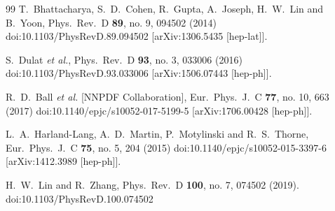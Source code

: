 \begin{thebibliography}{99}
  T.~Bhattacharya, S.~D.~Cohen, R.~Gupta, A.~Joseph, H.~W.~Lin and B.~Yoon,
  Phys.\ Rev.\ D {\bf 89}, no. 9, 094502 (2014)
  doi:10.1103/PhysRevD.89.094502
  [arXiv:1306.5435 [hep-lat]].


  S.~Dulat {\it et al.},
  Phys.\ Rev.\ D {\bf 93}, no. 3, 033006 (2016)
  doi:10.1103/PhysRevD.93.033006
  [arXiv:1506.07443 [hep-ph]].


  R.~D.~Ball {\it et al.} [NNPDF Collaboration],
  Eur.\ Phys.\ J.\ C {\bf 77}, no. 10, 663 (2017)
  doi:10.1140/epjc/s10052-017-5199-5
  [arXiv:1706.00428 [hep-ph]].


  L.~A.~Harland-Lang, A.~D.~Martin, P.~Motylinski and R.~S.~Thorne,
  Eur.\ Phys.\ J.\ C {\bf 75}, no. 5, 204 (2015)
  doi:10.1140/epjc/s10052-015-3397-6
  [arXiv:1412.3989 [hep-ph]].


  H.~W.~Lin and R.~Zhang,
  Phys.\ Rev.\ D {\bf 100}, no. 7, 074502 (2019).
  doi:10.1103/PhysRevD.100.074502

\end{thebibliography}
